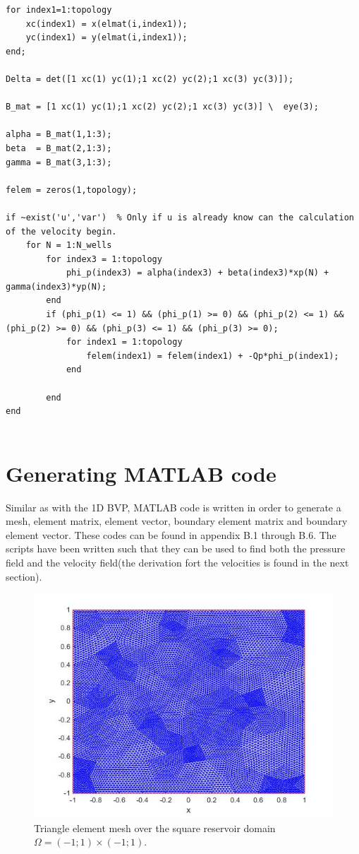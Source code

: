 \documentclass[a4paper]{report}
\begin{document}
\begin{lstlisting}
for index1=1:topology
	xc(index1) = x(elmat(i,index1));
	yc(index1) = y(elmat(i,index1));
end;

Delta = det([1 xc(1) yc(1);1 xc(2) yc(2);1 xc(3) yc(3)]);

B_mat = [1 xc(1) yc(1);1 xc(2) yc(2);1 xc(3) yc(3)] \  eye(3);

alpha = B_mat(1,1:3);
beta  = B_mat(2,1:3);
gamma = B_mat(3,1:3);

felem = zeros(1,topology);

if ~exist('u','var')  % Only if u is already know can the calculation of the velocity begin.
	for N = 1:N_wells
		for index3 = 1:topology
			phi_p(index3) = alpha(index3) + beta(index3)*xp(N) + gamma(index3)*yp(N);
		end
		if (phi_p(1) <= 1) && (phi_p(1) >= 0) && (phi_p(2) <= 1) && (phi_p(2) >= 0) && (phi_p(3) <= 1) && (phi_p(3) >= 0);
			for index1 = 1:topology
				felem(index1) = felem(index1) + -Qp*phi_p(index1); 
			end

		end
end


\end{lstlisting}


\section{Generating MATLAB code}

Similar as with the 1D BVP, MATLAB code is written in order to generate a mesh, element matrix, element vector, boundary element matrix and boundary element vector. These codes can be found in appendix B.1 through B.6. The scripts have been written such that they can be used to find both the pressure field and the velocity field(the derivation fort the velocities is found in the next section).


\begin{figure}[h]
	\centering
	\includegraphics[width=150mm]{finest_mesh.jpg}
	\caption{Triangle element mesh over the square reservoir domain $\Omega=(-1;1)\times (-1;1)$. \label{overflow}}
\end{figure}
\end{document}
